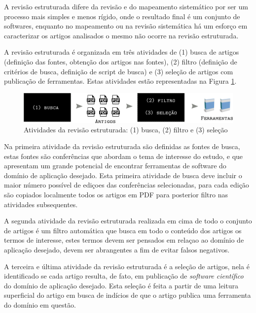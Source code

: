 A revisão estruturada difere da revisão e do mapeamento sistemático por ser um
processo mais simples e menos rígido, onde o resultado final é um conjunto de
softwares, enquanto no mapeamento ou na revisão sistemática há um esforço em
caracterizar os artigos analisados o mesmo não ocorre na revisão estruturada.

A revisão estruturada é organizada em três atividades de (1) busca de artigos
(definição das fontes, obtenção dos artigos nas fontes), (2) filtro (definição
de critérios de busca, definição de script de busca) e (3) seleção de artigos
com publicação de ferramentas. Estas atividades estão representadas na Figura
\ref{figura-revisao-estruturada}.

\begin{figure}[h]
  \center
  \includegraphics[scale=0.33]{imagens/revisao-estruturada.png}
  \caption{Atividades da revisão estruturada: (1) busca, (2) filtro e (3) seleção}
  \label{figura-revisao-estruturada}
\end{figure}

Na primeira atividade da revisão estruturada são definidas as fontes de busca,
estas fontes são conferências que abordam o tema de interesse do estudo, e que
apresentam um grande potencial de encontrar ferramentas de software
do domínio de aplicação desejado. Esta primeira atividade de busca deve
incluir o maior número possível de ediçoes das conferências selecionadas, para
cada edição são copiados localmente todos os artigos em PDF para posterior
filtro nas atividades subsequentes.

A segunda atividade da revisão estruturada realizada em cima de todo o conjunto
de artigos é um filtro automática que busca em todo o conteúdo dos artigos os
termos de interesse, estes termos devem ser pensados em relaçao ao domínio de aplicação
desejado, devem ser abrangentes a fim de evitar falsos negativos.

A terceira e última atividade da revisão estruturada é a seleção de artigos,
nela é identificado se cada artigo resulta, de fato, em publicação de {\it software científico}
do domínio de aplicação desejado. Esta seleção é feita a partir de uma
leitura superficial do artigo em busca de indícios de que o artigo publica uma
ferramenta do domínio em questão.

